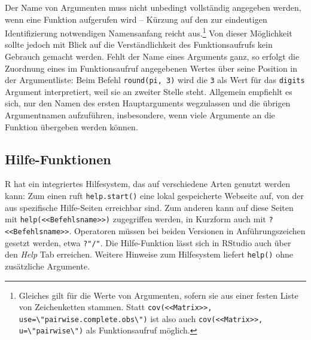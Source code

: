 Der Name von Argumenten muss nicht unbedingt vollständig angegeben werden, wenn eine Funktion aufgerufen wird -- Kürzung auf den zur eindeutigen Identifizierung notwendigen Namensanfang reicht aus.\footnote{Gleiches gilt für die Werte von Argumenten, sofern sie aus einer festen Liste von Zeichenketten stammen. Statt \lstinline!cov(<<Matrix>>, use=\"pairwise.complete.obs\")! ist also auch \lstinline!cov(<<Matrix>>, u=\"pairwise\")! als Funktionsaufruf möglich.} Von dieser Möglichkeit sollte jedoch mit Blick auf die Verständlichkeit des Funktionsaufrufs kein Gebrauch gemacht werden. Fehlt der Name eines Arguments ganz, so erfolgt die Zuordnung eines im Funktionsaufruf angegebenen Wertes über seine Position in der Argumentliste: Beim Befehl \lstinline!round(pi, 3)! wird die \lstinline!3! als Wert für das \lstinline!digits! Argument interpretiert, weil sie an zweiter Stelle steht. Allgemein empfiehlt es sich, nur den Namen des ersten Hauptarguments wegzulassen und die übrigen Argumentnamen aufzuführen, insbesondere, wenn viele Argumente an die Funktion übergeben werden können.

\subsection{Hilfe-Funktionen}
\label{sec:help}

R hat ein integriertes Hilfesystem, das auf verschiedene Arten genutzt werden kann: Zum einen ruft \lstinline!help.start()! eine lokal gespeicherte Webseite auf, von der aus spezifische Hilfe-Seiten erreichbar sind. Zum anderen kann auf diese Seiten mit \lstinline!help(<<Befehlsname>>)! zugegriffen werden, in Kurzform auch mit \lstinline!?<<Befehlsname>>!. Operatoren müssen bei beiden Versionen in Anführungszeichen gesetzt werden, etwa \lstinline!?"/"!. Die Hilfe-Funktion lässt sich in RStudio auch über den \emph{Help} Tab erreichen. Weitere Hinweise zum Hilfesystem liefert \lstinline!help()! ohne zusätzliche Argumente.

